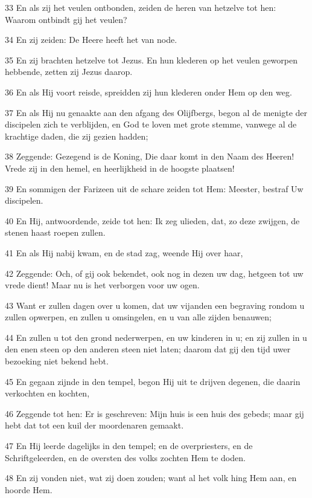 \par 33 En als zij het veulen ontbonden, zeiden de heren van hetzelve tot hen: Waarom ontbindt gij het veulen?
\par 34 En zij zeiden: De Heere heeft het van node.
\par 35 En zij brachten hetzelve tot Jezus. En hun klederen op het veulen geworpen hebbende, zetten zij Jezus daarop.
\par 36 En als Hij voort reisde, spreidden zij hun klederen onder Hem op den weg.
\par 37 En als Hij nu genaakte aan den afgang des Olijfbergs, begon al de menigte der discipelen zich te verblijden, en God te loven met grote stemme, vanwege al de krachtige daden, die zij gezien hadden;
\par 38 Zeggende: Gezegend is de Koning, Die daar komt in den Naam des Heeren! Vrede zij in den hemel, en heerlijkheid in de hoogste plaatsen!
\par 39 En sommigen der Farizeen uit de schare zeiden tot Hem: Meester, bestraf Uw discipelen.
\par 40 En Hij, antwoordende, zeide tot hen: Ik zeg ulieden, dat, zo deze zwijgen, de stenen haast roepen zullen.
\par 41 En als Hij nabij kwam, en de stad zag, weende Hij over haar,
\par 42 Zeggende: Och, of gij ook bekendet, ook nog in dezen uw dag, hetgeen tot uw vrede dient! Maar nu is het verborgen voor uw ogen.
\par 43 Want er zullen dagen over u komen, dat uw vijanden een begraving rondom u zullen opwerpen, en zullen u omsingelen, en u van alle zijden benauwen;
\par 44 En zullen u tot den grond nederwerpen, en uw kinderen in u; en zij zullen in u den enen steen op den anderen steen niet laten; daarom dat gij den tijd uwer bezoeking niet bekend hebt.
\par 45 En gegaan zijnde in den tempel, begon Hij uit te drijven degenen, die daarin verkochten en kochten,
\par 46 Zeggende tot hen: Er is geschreven: Mijn huis is een huis des gebeds; maar gij hebt dat tot een kuil der moordenaren gemaakt.
\par 47 En Hij leerde dagelijks in den tempel; en de overpriesters, en de Schriftgeleerden, en de oversten des volks zochten Hem te doden.
\par 48 En zij vonden niet, wat zij doen zouden; want al het volk hing Hem aan, en hoorde Hem.

